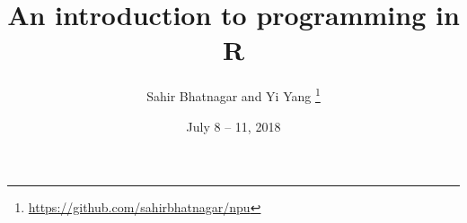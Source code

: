 \documentclass[11pt]{beamer}\usepackage[]{graphicx}\usepackage[]{color}
\begin{document}
\title[Intro to R]{An introduction to programming in R}

\author[]{Sahir Bhatnagar and Yi Yang%
\thanks{\href{https://github.com/sahirbhatnagar/npu}{https://github.com/sahirbhatnagar/npu}%
}}

\date{July 8 -- 11, 2018}


\maketitle

\end{document}
